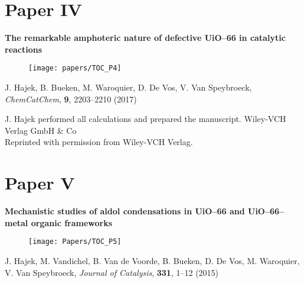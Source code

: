  

\clearpage{\pagestyle{empty}\cleardoublepage}



\section*{Paper IV}

\vspace{0.1\textheight}
{
\large
\textbf{The remarkable amphoteric nature of defective UiO--66 in catalytic
reactions} }
\begin{figure}[h!]
	\centering
	\texttt{[image: papers/TOC\_P4]}
\end{figure}
 
\noindent
J. Hajek, B. Bueken, M. Waroquier, D. De Vos, V. Van Speybroeck,
\textit{ChemCatChem}, \textbf{9}, 2203--2210 (2017)
\npar


\vfill

\noindent J. Hajek performed all calculations and prepared the manuscript. 
\npar
\noindent {} Wiley-VCH Verlag GmbH \& Co \\
Reprinted with permission from Wiley-VCH Verlag.

\clearpage{\pagestyle{empty}\cleardoublepage}

 

\clearpage{\pagestyle{empty}\cleardoublepage}



\section*{Paper V}

\vspace{0.1\textheight}
{
\large
\textbf{Mechanistic studies of aldol condensations in UiO--66 and
UiO--66-- metal organic frameworks} }
\begin{figure}[h!]
	\centering
	\texttt{[image: Papers/TOC\_P5]}
\end{figure}
 
\noindent
J. Hajek, M. Vandichel, B. Van de Voorde, B. Bueken, D. De Vos, M. Waroquier, V.
Van Speybroeck, \textit{Journal of Catalysis}, \textbf{331}, 1--12 (2015)
\npar

